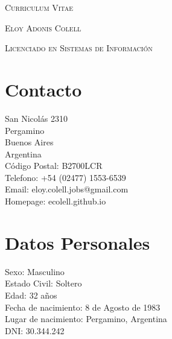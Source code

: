 \documentclass[a4paper]{article}
\begin{document}
\pagestyle{plain}

\begin{center}
\huge{\textsc{Curriculum Vitae}}
\vspace{\baselineskip}

\Large{\textsc{Eloy Adonis Colell}}
\vspace{\baselineskip}

\small{\textsc{Licenciado en Sistemas de Informaci{\'o}n}}
\end{center}
\vspace{1.5\baselineskip}

\section{Contacto}
\begin{flushleft}
San Nicol{\'a}s 2310 \\
Pergamino \\
Buenos Aires \\
Argentina \\
C{\'o}digo Postal: B2700LCR \\
Telefono: +54 (02477) 1553-6539 \\
Email: eloy.colell.jobs@gmail.com \\
Homepage: ecolell.github.io\\
\end{flushleft}

\section{Datos Personales}
\begin{flushleft}
Sexo: Masculino \\
Estado Civil: Soltero \\
Edad: 32 a\~{n}os \\
Fecha de nacimiento: 8 de Agosto de 1983 \\
Lugar de nacimiento: Pergamino, Argentina \\
DNI: 30.344.242 \\
\end{flushleft}
\end{document}
